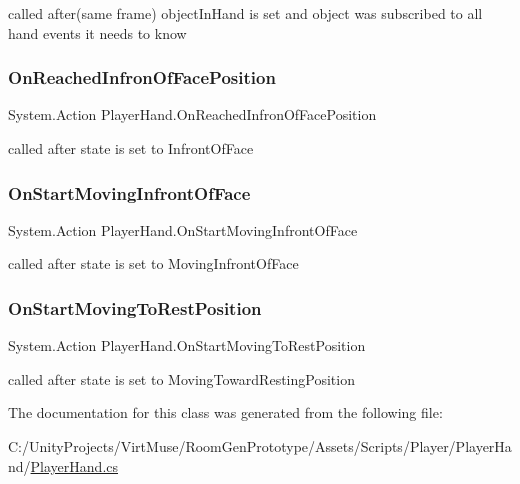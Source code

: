 called after(same frame) object\+In\+Hand is set and object was subscribed to all hand events it needs to know 

\mbox{\label{class_player_hand_a60b8dd996d175659c87dbea8266ff095}} 
\subsubsection{\texorpdfstring{On\+Reached\+Infron\+Of\+Face\+Position}{OnReachedInfronOfFacePosition}}
{\footnotesize\ttfamily System.\+Action Player\+Hand.\+On\+Reached\+Infron\+Of\+Face\+Position}



called after state is set to Infront\+Of\+Face 

\mbox{\label{class_player_hand_a144ea34305e5efa1ffae73c9d1f5fd9d}} 
\subsubsection{\texorpdfstring{On\+Start\+Moving\+Infront\+Of\+Face}{OnStartMovingInfrontOfFace}}
{\footnotesize\ttfamily System.\+Action Player\+Hand.\+On\+Start\+Moving\+Infront\+Of\+Face}



called after state is set to Moving\+Infront\+Of\+Face 

\mbox{\label{class_player_hand_a4e94ca5bad6ece9013cd872dcf373074}} 
\subsubsection{\texorpdfstring{On\+Start\+Moving\+To\+Rest\+Position}{OnStartMovingToRestPosition}}
{\footnotesize\ttfamily System.\+Action Player\+Hand.\+On\+Start\+Moving\+To\+Rest\+Position}



called after state is set to Moving\+Toward\+Resting\+Position 



The documentation for this class was generated from the following file\+:\begin{DoxyCompactItemize}
\item 
C\+:/\+Unity\+Projects/\+Virt\+Muse/\+Room\+Gen\+Prototype/\+Assets/\+Scripts/\+Player/\+Player\+Hand/\mbox{\hyperlink{_player_hand_8cs}{Player\+Hand.\+cs}}\end{DoxyCompactItemize}
